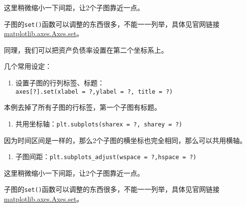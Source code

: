 \documentclass[
  letterpaper,
  DIV=11,
  numbers=noendperiod]{scrreprt}
\providecommand{\tightlist}{%
  \setlength{\itemsep}{0pt}\setlength{\parskip}{0pt}}\usepackage{longtable,booktabs,array}
\begin{document}
这里稍微缩小一下间距，让2个子图靠近一点。

子图的\texttt{set()}函数可以调整的东西很多，不能一一列举，具体见官网链接
\href{https://matplotlib.org/stable/api/_as_gen/matplotlib.axes.Axes.set.html}{matplotlib.axes.Axes.set}。

同理，我们可以把资产负债率设置在第二个坐标系上。

几个常用设定：

\begin{enumerate}
\def\labelenumi{\arabic{enumi}.}
\tightlist
\item
  设置子图的行列标签、标题：
  \texttt{axes{[}?{]}.set(xlabel\ =\ ?,ylabel\ =\ ?,\ title\ =\ ?)}
\end{enumerate}

本例去掉了所有子图的行标签，第一个子图有标题。

\begin{enumerate}
\def\labelenumi{\arabic{enumi}.}
\setcounter{enumi}{1}
\tightlist
\item
  共用坐标轴：\texttt{plt.subplots(sharex\ =\ ?,\ sharey\ =\ ?)}
\end{enumerate}

因为时间区间是一样的，那么2个子图的横坐标也完全相同，那么可以共用横轴。

\begin{enumerate}
\def\labelenumi{\arabic{enumi}.}
\setcounter{enumi}{2}
\tightlist
\item
  子图间距：\texttt{plt.subplots\_adjust(wspace\ =\ ?,hspace\ =\ ?)}
\end{enumerate}

这里稍微缩小一下间距，让2个子图靠近一点。

子图的\texttt{set()}函数可以调整的东西很多，不能一一列举，具体见官网链接
\href{https://matplotlib.org/stable/api/_as_gen/matplotlib.axes.Axes.set.html}{matplotlib.axes.Axes.set}。
\end{document}
